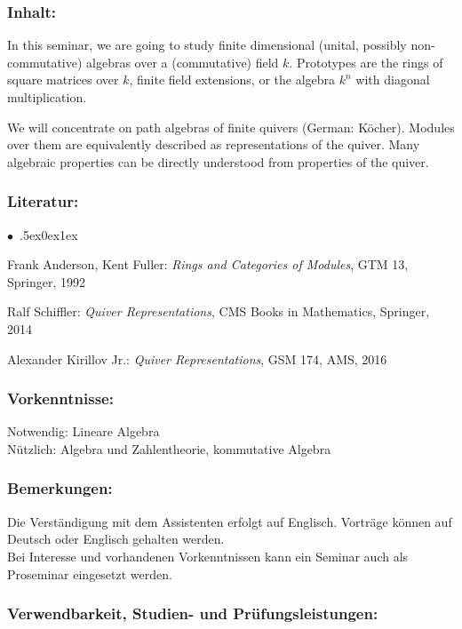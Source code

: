 \documentclass[a4paper,10pt]{article}
\renewenvironment{itemize}{\begin{list}{$\bullet$\ }{\itemsep.5ex\setlength{\topsep}{0.5\itemsep}\parsep0ex\labelsep1ex\settowidth{\labelwidth}{$\bullet$\ }\setlength{\leftmargin}{\labelwidth}\addtolength{\leftmargin}{3ex}\addtolength{\leftmargin}{\labelsep}}}{\end{list}}
\begin{document}
\subsubsection*{\large
    Inhalt:
}
In this seminar, we are going to study finite dimensional (unital, possibly non-commutative) algebras over a (commutative) field $k$. Prototypes are the rings of square matrices over $k$, finite field extensions, or the algebra $k^n$ with diagonal multiplication. 

We will concentrate on path algebras of finite quivers (German: Köcher). Modules over them are equivalently described as representations of the quiver. Many algebraic properties can be directly understood from properties of the quiver. 

\subsubsection*{\large
    Literatur:
}
\begin{itemize}
\item
Frank Anderson, Kent Fuller: \emph{Rings and Categories of Modules}, GTM 13, Springer, 1992 
\item
Ralf Schiffler: \emph{Quiver Representations}, CMS Books in Mathematics, Springer, 2014 
\item
Alexander Kirillov Jr.: \emph{Quiver Representations}, GSM 174, AMS, 2016
\end{itemize}
\subsubsection*{\large
    Vorkenntnisse:
}
Notwendig: Lineare Algebra \\
Nützlich: Algebra und Zahlentheorie, kommutative Algebra
\subsubsection*{\large
    Bemerkungen:
}
Die Verständigung mit dem Assistenten erfolgt auf Englisch. Vorträge können auf Deutsch oder Englisch gehalten werden. \\
Bei Interesse und vorhandenen Vorkenntnissen kann ein Seminar auch als Proseminar eingesetzt werden.
\subsubsection*{\large
    Verwendbarkeit, Studien- und Prüfungsleistungen:
}
\end{document}
